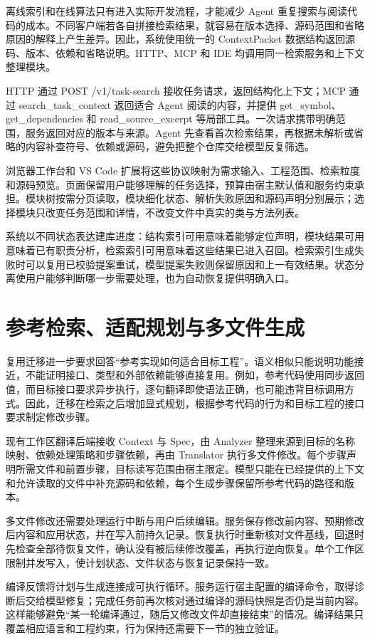 离线索引和在线算法只有进入实际开发流程，才能减少 Agent 重复搜索与阅读代码的成本。不同客户端若各自拼接检索结果，就容易在版本选择、源码范围和省略原因的解释上产生差异。因此，系统使用统一的 ContextPacket 数据结构返回源码、版本、依赖和省略说明。HTTP、MCP 和 IDE 均调用同一检索服务和上下文整理模块。

HTTP 通过 POST /v1/task-search 接收任务请求，返回结构化上下文；MCP 通过 search\_task\_context 返回适合 Agent 阅读的内容，并提供 get\_symbol、get\_dependencies 和 read\_source\_excerpt 等局部工具。一次请求携带明确范围，服务返回对应的版本与来源。Agent 先查看首次检索结果，再根据未解析或省略的内容补查符号、依赖或源码，避免把整个仓库交给模型反复筛选。

浏览器工作台和 VS Code 扩展将这些协议映射为需求输入、工程范围、检索粒度和源码预览。页面保留用户能够理解的任务选择，预算由宿主默认值和服务约束承担。模块树按需分页读取，模块细化状态、解析失败原因和源码声明分别展示；选择模块只改变任务范围和详情，不改变文件中真实的类与方法列表。

系统以不同状态表达建库进度：结构索引可用意味着能够定位声明，模块结果可用意味着已有职责分析，检索索引可用意味着这些结果已进入召回。检索索引生成失败时可以复用已校验提案重试，模型提案失败则保留原因和上一有效结果。状态分离使用户能够判断哪一步需要处理，也为自动恢复提供明确入口。

\section{参考检索、适配规划与多文件生成}

复用迁移进一步要求回答“参考实现如何适合目标工程”。语义相似只能说明功能接近，不能证明接口、类型和外部依赖能够直接复用。例如，参考代码使用同步返回值，而目标接口要求异步执行，逐句翻译即使语法正确，也可能违背目标调用方式。因此，迁移在检索之后增加显式规划，根据参考代码的行为和目标工程的接口要求制定修改步骤。

现有工作区翻译后端接收 Context 与 Spec，由 Analyzer 整理来源到目标的名称映射、依赖处理策略和步骤依赖，再由 Translator 执行多文件修改。每个步骤声明所需文件和前置步骤，目标读写范围由宿主限定。模型只能在已经提供的上下文和允许读取的文件中补充源码和依赖，每个生成步骤保留所参考代码的路径和版本。

多文件修改还需要处理运行中断与用户后续编辑。服务保存修改前内容、预期修改后内容和应用状态，并在写入前持久记录。恢复执行时重新核对文件基线，回退时先检查全部待恢复文件，确认没有被后续修改覆盖，再执行逆向恢复。单个工作区限制并发写入，使计划状态、文件状态与恢复记录保持一致。

编译反馈将计划与生成连接成可执行循环。服务运行宿主配置的编译命令，取得诊断后交给模型修复；完成任务前再次核对通过编译的源码快照是否仍是当前内容。这样能够避免“某一轮编译通过，随后又修改文件却直接结束”的情况。编译结果只覆盖相应语言和工程约束，行为保持还需要下一节的独立验证。

